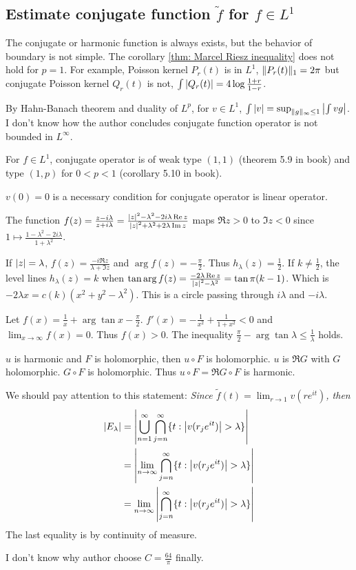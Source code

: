 \subsection{Estimate conjugate function $\tilde{f}$ for $f\in L^1$}
The conjugate or harmonic function is always exists, but the behavior of boundary is not simple. The corollary \ref{thm: Marcel Riesz inequality} does not hold for $p=1$. For example, Poisson kernel $P_r(t)$ is in $L^1$, $\lVert P_r(t)\rVert_1=2\pi$ but conjugate
Poisson kernel $Q_r(t)$ is not, $\int{\left\lvert Q_r(t)\right\rvert}=4\log{\frac{1+r}{1-r}}$.
\begin{remark}\label{conjugate operator not bounded in L^infty}
    By Hahn-Banach theorem and duality of $L^p$, for $v\in L^1$, $\int{\left\lvert v\right\rvert}=\sup_{\lVert g\rVert_\infty\leq 1}{\left\lvert\int{vg}\right\rvert}$.
        {\color{blue}I don't know how the author concludes conjugate function operator is not bounded in $L^\infty$}.
\end{remark}
For $f\in L^1$, conjugate operator is of weak type $(1,1)$ (theorem 5.9 in book) and type $(1,p)$ for $0<p<1$ (corollary 5.10 in book).
\begin{remark}
    $v(0)=0$ is a necessary condition for conjugate operator is linear operator.\par
    The function $f(z)=\frac{z-i\lambda}{z+i\lambda}=\frac{\left\lvert z\right\rvert^2-\lambda^2-2i\lambda\operatorname{Re}{z}}{\left\lvert z\right\rvert^2+\lambda^2+2\lambda\operatorname{Im}{z}}$ maps $\Re{z}>0$ to {\color{red}$\Im{z}<0$} since $1\mapsto\frac{1-\lambda^2-2i\lambda}{1+\lambda^2}$.\par
    If $\left\lvert z\right\rvert=\lambda$, $f(z)=\frac{-i\Re{z}}{\lambda+\Im{z}}$ and $\arg{f(z)}=-\frac{\pi}{2}$. Thus $h_\lambda(z)=\frac{1}{2}$. If $k\neq \frac{1}{2}$, the level lines $h_\lambda(z)=k$ when $\tan\arg{f(z)}=\frac{-2\lambda\operatorname{Re}{z}}{\left\lvert z\right\rvert^2-\lambda^2}=\tan\pi(k-1)$. Which is $-2\lambda x=c(k)(x^2+y^2-\lambda^2)$. This is a circle passing through $i\lambda$ and $-i\lambda$.\par
    Let $f(x)=\frac{1}{x}+\arg{\tan{x}}-\frac{\pi}{2}$. $f'(x)=-\frac{1}{x^2}+\frac{1}{1+x^2}<0$ and $\lim_{x\to\infty}f(x)=0$. Thus $f(x)>0$. The inequality $\frac{\pi}{2}-\arg{\tan{\lambda}}\leq\frac{1}{\lambda}$ holds.\par
    $u$ is harmonic and $F$ is holomorphic, then $u\circ F$ is holomorphic. $u$ is $\Re{G}$ with $G$ holomorphic. $G\circ F$ is holomorphic. Thus $u\circ F=\Re{G\circ F}$ is harmonic.\par
    We should pay attention to this statement: \emph{Since $\tilde{f}(t)=\lim_{r\to 1}{v(re^{it})}$, then}
    \begin{align*}
        \left\lvert E_\lambda\right\rvert & =\left\lvert\bigcup_{n=1}^{\infty}\bigcap_{j=n}^{\infty}\{t:\left\lvert v(r_je^{it})\right\rvert>\lambda\}\right\rvert \\
                        & =\left\lvert\lim_{n\to\infty}\bigcap_{j=n}^{\infty}\{t:\left\lvert v(r_je^{it})\right\rvert>\lambda\}\right\rvert      \\
                        & =\lim_{n\to\infty}\left\lvert\bigcap_{j=n}^{\infty}\{t:\left\lvert v(r_je^{it})\right\rvert>\lambda\}\right\rvert
    \end{align*}
    The last equality is by continuity of measure.\par
    {\color{blue}I don't know why author choose $C=\frac{64}{\pi}$ finally}.
\end{remark}
